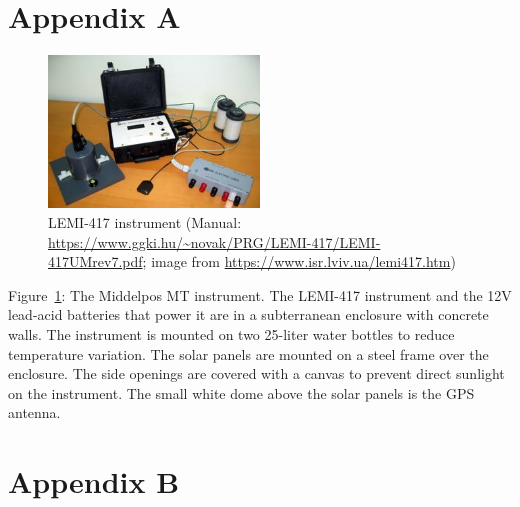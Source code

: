 \documentclass[draft,linenumbers]{agujournal2018}
\begin{document}
\section{Appendix A}

\begin{figure}[h]
  \centering
  \includegraphics[width=0.5\textwidth]{figures/LEMI-417.jpg}
  \caption{LEMI-417 instrument (Manual: \url{https://www.ggki.hu/~novak/PRG/LEMI-417/LEMI-417UMrev7.pdf}; image from \url{https://www.isr.lviv.ua/lemi417.htm})}
  \label{fig:lemi}
\end{figure}

Figure~\ref{fig:lemi}: The Middelpos MT instrument. The LEMI-417 instrument and the 12V lead-acid batteries that power it are in a subterranean enclosure with concrete walls. The instrument is mounted on two 25-liter water bottles to reduce temperature variation. The solar panels are mounted on a steel frame over the enclosure. The side openings are covered with a canvas to prevent direct sunlight on the instrument. The small white dome above the solar panels is the GPS antenna.

\section{Appendix B}
\end{document}
